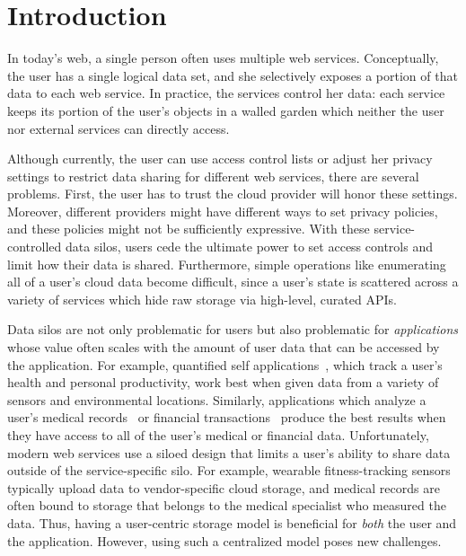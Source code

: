 \chapter{Introduction}
\label{sec:intro}

In today's web, a single person often 
uses multiple web services. 
Conceptually, the user has a single
logical data set, and she selectively
exposes a portion of that data to each
web service. In practice, the services
control her data: each service keeps its
portion of the user's objects in a walled
garden which neither the user nor external
services can directly access.

Although currently, the user can use access control
lists or adjust her privacy settings to 
restrict data sharing 
for different web services, there are
several problems. First, the user has to trust
the cloud provider will honor these settings.
Moreover, different providers might have 
different ways to set privacy policies,
and these policies might not be sufficiently
expressive. With these service-controlled data silos, 
users cede the
ultimate power to set access controls and
limit how their data is shared. Furthermore, simple
operations like enumerating all of a user's
cloud data become difficult, since a user's
state is scattered across a variety of services
which hide raw storage via high-level, curated
APIs.

Data silos are not only problematic for
users but also problematic for
\emph{applications} whose value often scales
with the amount of user data that can be
accessed by the application. For example,
quantified self applications~\cite{beam},
which track a user's health and personal
productivity, work best when given data
from a variety of sensors and environmental
locations. Similarly, applications which analyze a
user's medical records~\cite{lark} or financial
transactions~\cite{mint} produce the best
results when they have access to 
all of the user's medical or financial data.
Unfortunately, modern web services use
a siloed design that limits a user's ability to share 
data outside of the service-specific silo. 
For example, wearable
fitness-tracking sensors typically upload data
to vendor-specific cloud storage, and medical
records are often bound to storage that belongs
to the medical specialist who measured the
data. Thus, having a user-centric storage model
is beneficial for \emph{both} the user and the application.
However, using such a centralized model poses new challenges.

